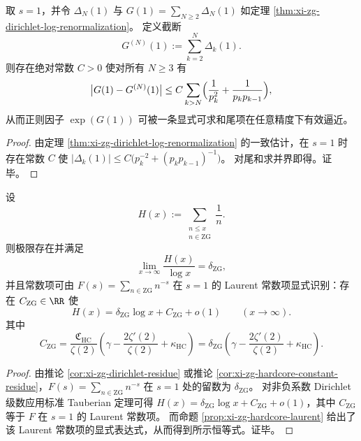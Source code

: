 

\begin{proposition}[临界重整化常数的可计算误差界]\label{prop:xi-zg-holographic-constant-tail-bound}
取 \(s=1\)，并令 \(\Delta_N(1)\) 与 \(G(1)=\sum_{N\ge 2}\Delta_N(1)\) 如定理 \ref{thm:xi-zg-dirichlet-log-renormalization}。
定义截断
\[
G^{(N)}(1):=\sum_{k=2}^{N}\Delta_k(1).
\]
则存在绝对常数 \(C>0\) 使对所有 \(N\ge 3\) 有
\[
\bigl|G(1)-G^{(N)}(1)\bigr|
\le
C\sum_{k>N}\Bigl(\frac1{p_k^2}+\frac1{p_kp_{k-1}}\Bigr),
\]
从而正则因子 \(\exp(G(1))\) 可被一条显式可求和尾项在任意精度下有效逼近。
\end{proposition}

\begin{proof}
由定理 \ref{thm:xi-zg-dirichlet-log-renormalization} 的一致估计，在 \(s=1\) 时存在常数 \(C\) 使
\(
|\Delta_k(1)|
\le C\bigl(p_k^{-2}+(p_kp_{k-1})^{-1}\bigr)
\)。
对尾和求并界即得。证毕。
\end{proof}

\begin{theorem}\label{thm:xi-zg-log-mertens}
设
\[
H(x):=\sum_{\substack{n\le x\\ n\in\mathrm{ZG}}}\frac1n.
\]
则极限存在并满足
\[
\lim_{x\to\infty}\frac{H(x)}{\log x}=\delta_{\mathrm{ZG}},
\]
并且常数项可由 \(F(s)=\sum_{n\in\mathrm{ZG}}n^{-s}\) 在 \(s=1\) 的 Laurent 常数项显式识别：存在 \(C_{\mathrm{ZG}}\in\RR\) 使
\[
H(x)=\delta_{\mathrm{ZG}}\log x+C_{\mathrm{ZG}}+o(1)\qquad(x\to\infty).
\]
其中
\[
C_{\mathrm{ZG}}
=\frac{\mathfrak C_{\mathrm{HC}}}{\zeta(2)}
\left(\gamma-\frac{2\zeta'(2)}{\zeta(2)}+\kappa_{\mathrm{HC}}\right)
=\delta_{\mathrm{ZG}}
\left(\gamma-\frac{2\zeta'(2)}{\zeta(2)}+\kappa_{\mathrm{HC}}\right).
\]
\end{theorem}

\begin{proof}
由推论 \ref{cor:xi-zg-dirichlet-residue} 或推论 \ref{cor:xi-zg-hardcore-constant-residue}，\(F(s)=\sum_{n\in\mathrm{ZG}}n^{-s}\) 在 \(s=1\) 处的留数为 \(\delta_{\mathrm{ZG}}\)。
对非负系数 Dirichlet 级数应用标准 Tauberian 定理可得
\(
H(x)=\delta_{\mathrm{ZG}}\log x+C_{\mathrm{ZG}}+o(1)
\)，其中 \(C_{\mathrm{ZG}}\) 等于 \(F\) 在 \(s=1\) 的 Laurent 常数项。
而命题 \ref{prop:xi-zg-hardcore-laurent} 给出了该 Laurent 常数项的显式表达式，从而得到所示恒等式。证毕。
\end{proof}


